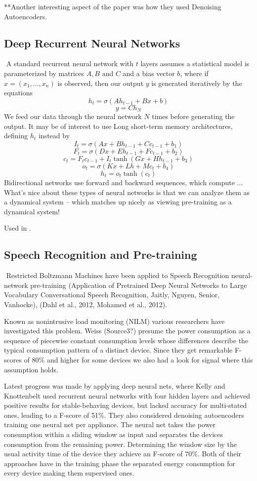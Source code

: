 \documentclass{article}
\begin{document}
**Another interesting aspect of the paper was how they used Denoising Autoencoders.
​
\subsection{Deep Recurrent Neural Networks}
​
A standard recurrent neural network with $t$ layers assumes a statistical model is parameterized by matrices $A,B$ and $C$ and a bias vector $b$, where if $x = (x_1, \dots, x_n)$ is observed, then our output $y$ is generated iteratively by the equations
%
\[ h_t = \sigma(A h_{t-1} + B x + b) \]
%
\[ y = C h_N \]
%
We feed our data through the neural network $N$ times before generating the output. It may be of interest to use Long short-term memory architectures, defining $h_t$ instead by
%
\[ I_t = \sigma(Ax + B h_{t-1} + C c_{t-1} + b_1) \]
%
\[ F_t = \sigma(Dx + E h_{t-1} + F c_{t-1} + b_2) \]
%
\[ c_t = F_t c_{t-1} + I_t \tanh(G x + H h_{t-1} + b_3) \]
%
\[ o_t = \sigma(K x + L h + M c_t + b_4) \]
%
\[ h_t = o_t \tanh(c_t) \]
​
Bidirectional networks use forward and backward sequences, which compute ...
​
What's nice about these types of neural networks is that we can analyze them as a dynamical system -- which matches up nicely as viewing pre-training as a dynamical system!

Used in \cite{Kelly}.
​
\subsection{Speech Recognition and Pre-training}
​
Restricted Boltzmann Machines have been applied to Speech Recognition neural-network pre-training (Application of Pretrained Deep
Neural Networks to Large
Vocabulary Conversational Speech
Recognition, Jaitly, Nguyen, Senior, Vanhocke), (Dahl et al., 2012, Mohamed et al., 2012).


Known as nonintrusive load monitoring (NILM) various researchers have investigated this problem. Weiss (Source3?) presume the power consumption as a sequence of piecewise constant consumption levels whose differences describe the typical consumption pattern of a distinct device. Since they get remarkable F-scores of 80\% and higher for some devices we also had a look for signal where this assumption holds.

Latest progress was made by applying deep neural nets, where Kelly and Knottenbelt \cite{Kelly} used recurrent neural networks with four hidden layers and achieved positive results for stable-behaving devices, but lacked accuracy for multi-stated ones, leading to a F-score of 51\%. They also considered denoising autoencoders training one neural net per appliance. The neural net takes the power consumption within a sliding window as input and separates the devices consumption from the remaining power. Determining the window size by the usual activity time of the device they achieve an F-score of 70\%. Both of their approaches have in the training phase the separated energy consumption for every device making them supervised ones.
\end{document}

